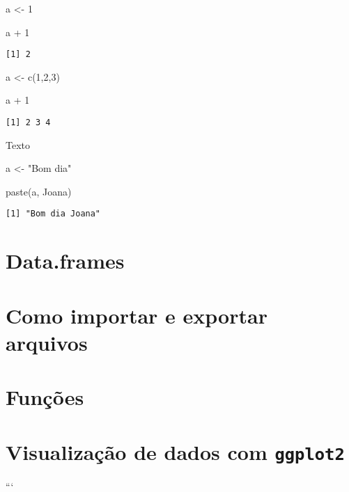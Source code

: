 \documentclass[
  letterpaper,
  DIV=11,
  numbers=noendperiod]{scrreprt}
\newenvironment{Shaded}{\begin{snugshade}}{\end{snugshade}}
\newcommand{\DecValTok}[1]{\textcolor[rgb]{0.68,0.00,0.00}{#1}}
\newcommand{\FunctionTok}[1]{\textcolor[rgb]{0.28,0.35,0.67}{#1}}
\newcommand{\NormalTok}[1]{\textcolor[rgb]{0.00,0.23,0.31}{#1}}
\newcommand{\OtherTok}[1]{\textcolor[rgb]{0.00,0.23,0.31}{#1}}
\newcommand{\SpecialCharTok}[1]{\textcolor[rgb]{0.37,0.37,0.37}{#1}}
\newcommand{\StringTok}[1]{\textcolor[rgb]{0.13,0.47,0.30}{#1}}
\begin{document}
\begin{Shaded}
\begin{Highlighting}[]
\NormalTok{a }\OtherTok{\textless{}{-}} \DecValTok{1}

\NormalTok{a }\SpecialCharTok{+} \DecValTok{1}
\end{Highlighting}
\end{Shaded}

\begin{verbatim}
[1] 2
\end{verbatim}

\begin{Shaded}
\begin{Highlighting}[]
\NormalTok{a }\OtherTok{\textless{}{-}} \FunctionTok{c}\NormalTok{(}\DecValTok{1}\NormalTok{,}\DecValTok{2}\NormalTok{,}\DecValTok{3}\NormalTok{)}

\NormalTok{a }\SpecialCharTok{+} \DecValTok{1}
\end{Highlighting}
\end{Shaded}

\begin{verbatim}
[1] 2 3 4
\end{verbatim}

Texto

\begin{Shaded}
\begin{Highlighting}[]
\NormalTok{a }\OtherTok{\textless{}{-}} \StringTok{"Bom dia"}

\FunctionTok{paste}\NormalTok{(a, }\StringTok{\textquotesingle{}Joana\textquotesingle{}}\NormalTok{)}
\end{Highlighting}
\end{Shaded}

\begin{verbatim}
[1] "Bom dia Joana"
\end{verbatim}

\hypertarget{data.frames}{%
\section{Data.frames}\label{data.frames}}

\hypertarget{como-importar-e-exportar-arquivos}{%
\section{Como importar e exportar
arquivos}\label{como-importar-e-exportar-arquivos}}

\hypertarget{funuxe7uxf5es}{%
\section{Funções}\label{funuxe7uxf5es}}

\hypertarget{visualizauxe7uxe3o-de-dados-com-ggplot2}{%
\section{\texorpdfstring{Visualização de dados com
\texttt{ggplot2}}{Visualização de dados com ggplot2}}\label{visualizauxe7uxe3o-de-dados-com-ggplot2}}

```
\end{document}
